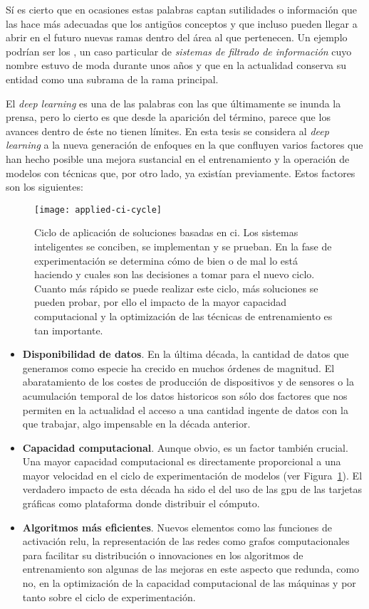 Sí es cierto que en ocasiones estas palabras captan sutilidades o información que las hace más adecuadas que los antigüos conceptos y que incluso pueden llegar a abrir en el futuro nuevas ramas dentro del área al que pertenecen. Un ejemplo podrían ser los , un caso particular de \textit{sistemas de filtrado de información} cuyo nombre estuvo de moda durante unos años y que en la actualidad conserva su entidad como una subrama de la rama principal.

El \textit{deep learning} es una de las palabras con las que últimamente se inunda la prensa, pero lo cierto es que desde la aparición del término, parece que los avances dentro de éste no tienen límites. En esta tesis se considera al \textit{deep learning} a la nueva generación de enfoques en la que confluyen varios factores que han hecho posible una mejora sustancial en el entrenamiento y la operación de modelos con técnicas que, por otro lado, ya existían previamente. Estos factores son los siguientes:

\begin{figure}[t]
	\centering
	\texttt{[image: applied-ci-cycle]}
	\caption[Ciclo de aplicación de soluciones basadas en ]{Ciclo de aplicación de soluciones basadas en \acrlong{ci}. Los sistemas inteligentes se conciben, se implementan y se prueban. En la fase de experimentación se determina cómo de bien o de mal lo está haciendo y cuales son las decisiones a tomar para el nuevo ciclo. Cuanto más rápido se puede realizar este ciclo, más soluciones se pueden probar, por ello el impacto de la mayor capacidad computacional y la optimización de las técnicas de entrenamiento es tan importante.}
	\label{fig:applied-ci-cycle}
\end{figure}

\begin{itemize}
	\item \textbf{Disponibilidad de datos}. En la última década, la cantidad de datos que generamos como especie ha crecido en muchos órdenes de magnitud. El abaratamiento de los costes de producción de dispositivos y de sensores o la acumulación temporal de los datos historicos son sólo dos factores que nos permiten en la actualidad el acceso a una cantidad ingente de datos con la que trabajar, algo impensable en la década anterior.
	\item \textbf{Capacidad computacional}. Aunque obvio, es un factor también crucial. Una mayor capacidad computacional es directamente proporcional a una mayor velocidad en el ciclo de experimentación de modelos (ver Figura~\ref{fig:applied-ci-cycle}). El verdadero impacto de esta década ha sido el del uso de las \gls{gpu} de las tarjetas gráficas como plataforma donde distribuir el cómputo.
	\item \textbf{Algoritmos más eficientes}. Nuevos elementos como las funciones de activación \acrshort{relu}, la representación de las redes como grafos computacionales para facilitar su distribución o innovaciones en los algoritmos de entrenamiento son algunas de las mejoras en este aspecto que redunda, como no, en la optimización de la capacidad computacional de las máquinas y por tanto sobre el ciclo de experimentación.
\end{itemize}

